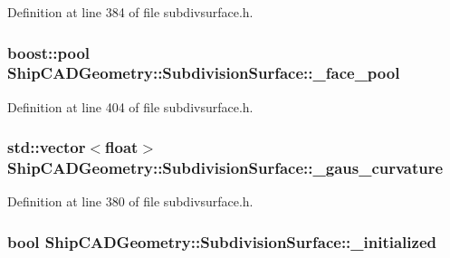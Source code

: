 Definition at line 384 of file subdivsurface.\-h.

\hypertarget{classShipCADGeometry_1_1SubdivisionSurface_a66ebffe9b49fbdc29df0f3747affb786}{
\subsubsection[{\-\_\-face\-\_\-pool}]{\setlength{\rightskip}{0pt plus 5cm}boost\-::pool Ship\-C\-A\-D\-Geometry\-::\-Subdivision\-Surface\-::\-\_\-face\-\_\-pool\hspace{0.3cm}{\ttfamily [protected]}}}\label{classShipCADGeometry_1_1SubdivisionSurface_a66ebffe9b49fbdc29df0f3747affb786}


Definition at line 404 of file subdivsurface.\-h.

\hypertarget{classShipCADGeometry_1_1SubdivisionSurface_aa7f39e4d68d2b36a0a8ce3d6e386bce7}{
\subsubsection[{\-\_\-gaus\-\_\-curvature}]{\setlength{\rightskip}{0pt plus 5cm}std\-::vector$<$float$>$ Ship\-C\-A\-D\-Geometry\-::\-Subdivision\-Surface\-::\-\_\-gaus\-\_\-curvature\hspace{0.3cm}{\ttfamily [protected]}}}\label{classShipCADGeometry_1_1SubdivisionSurface_aa7f39e4d68d2b36a0a8ce3d6e386bce7}


Definition at line 380 of file subdivsurface.\-h.

\hypertarget{classShipCADGeometry_1_1SubdivisionSurface_a3276e7cb242a6f2bbc1730ca4b545264}{
\subsubsection[{\-\_\-initialized}]{\setlength{\rightskip}{0pt plus 5cm}bool Ship\-C\-A\-D\-Geometry\-::\-Subdivision\-Surface\-::\-\_\-initialized\hspace{0.3cm}{\ttfamily [protected]}}}\label{classShipCADGeometry_1_1SubdivisionSurface_a3276e7cb242a6f2bbc1730ca4b545264}


